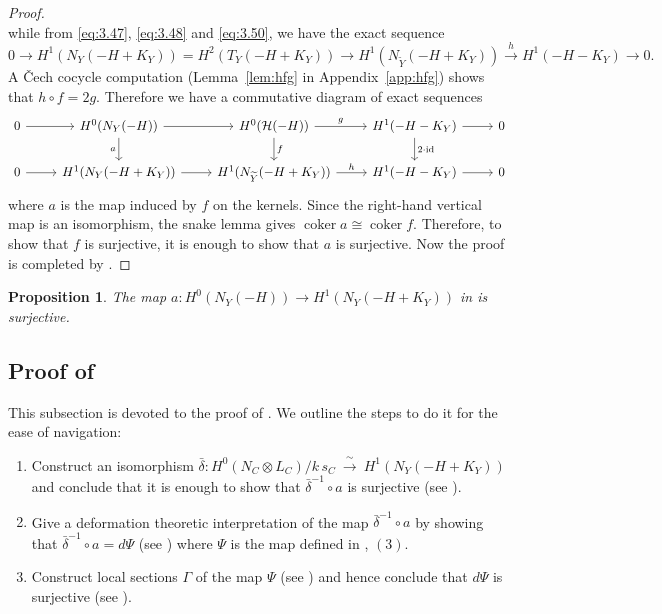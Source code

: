 \documentclass[11pt,reqno]{amsart}
\theoremstyle{plain}
\newtheorem{proposition}[theorem]{Proposition}
\theoremstyle{definition}
\newcommand{\coker}{\operatorname{coker}}
\newcommand{\id}{\mathrm{id}}
\newcommand{\Yt}{\widetilde{Y}}
\newcommand{\NY}{N_{Y}}
\newcommand{\NYt}{N_{\Yt}}
\newcommand{\Hc}{\mathcal{H}}
\begin{document}
\begin{proof}
\[\]
while from \eqref{eq:3.47}, \eqref{eq:3.48} and \eqref{eq:3.50}, we have the exact sequence
\[
0\to H^1(\NY(-H+K_Y))=H^2(T_Y(-H+K_Y))\to H^1(\NYt(-H+K_Y))\xrightarrow{\ h\ } H^1(-H-K_Y)\to 0 .
\]
A \v{C}ech cocycle computation (Lemma~\ref{lem:hfg} in Appendix~\ref{app:hfg}) shows that $h\circ f=2g$. Therefore we have a commutative diagram of exact sequences
\begin{equation}\label{diag:a}
\begin{tikzcd}[column sep=normal]
0\arrow[r] & H^0(\NY(-H))\arrow[r]\arrow[d,"a"'] & H^0(\Hc(-H))\arrow[r,"g"]\arrow[d,"f"] & H^1(-H-K_Y)\arrow[r]\arrow[d,"2\cdot\id"] & 0\\
0\arrow[r] & H^1(\NY(-H+K_Y))\arrow[r] & H^1(\NYt(-H+K_Y))\arrow[r,"h"] & H^1(-H-K_Y)\arrow[r] & 0
\end{tikzcd}
\end{equation}
where $a$ is the map induced by $f$ on the kernels. Since the right-hand vertical map is an isomorphism, the snake lemma gives $\coker a\cong\coker f$. Therefore, to show that $f$ is surjective, it is enough to show that $a$ is surjective. Now the proof is completed by  .
\end{proof}

\begin{proposition}\label{surjectivity of a}
The map $a: H^0(\NY(-H)) \to H^1(\NY(-H+K_Y))$ in  is surjective.
\end{proposition}

\subsection{Proof of }

This subsection is devoted to the proof of . We outline the steps to do it for the ease of navigation:

\begin{enumerate}
    \item Construct an isomorphism $\bar\delta\colon H^0(N_C\otimes L_C)/k\,s_C\ \xrightarrow{\ \sim\ }\ H^1(\NY(-H+K_Y))$ and conclude that it is enough to show that $\bar{\delta}^{-1} \circ a$ is surjective (see ).

    \item Give a deformation theoretic interpretation of the map $\bar{\delta}^{-1} \circ a$ by showing that $\bar{\delta}^{-1} \circ a = d\Psi$ (see ) where $\Psi$ is the map defined in , $(3)$.

    \item Construct local sections $\Gamma$ of the map $\Psi$ (see ) and hence conclude that $d\Psi$ is surjective (see ).
\end{enumerate}
\end{document}
